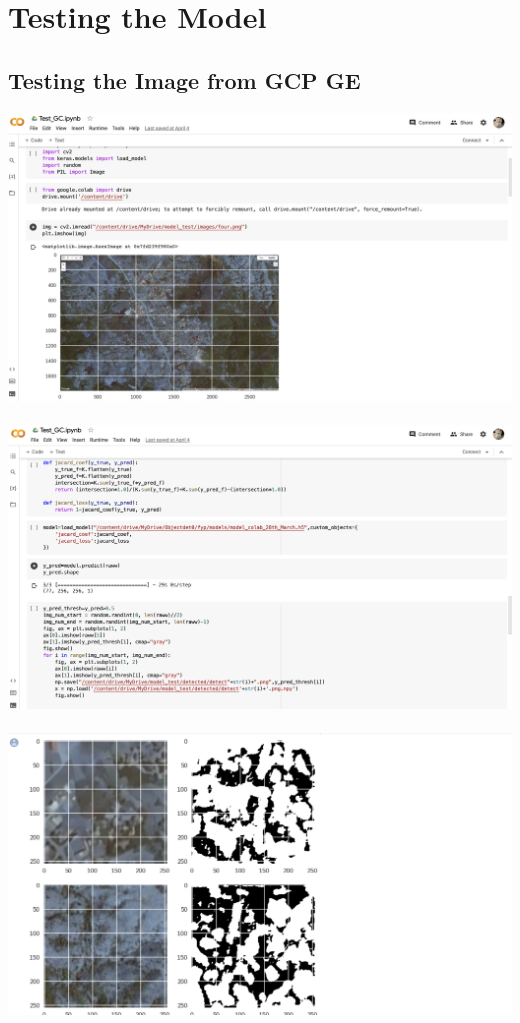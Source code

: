 \chapter{Testing the Model}
\section{Testing the Image from GCP GE}
\includegraphics[scale=0.4]{screenshts/19.png}\\\\
\includegraphics[scale=0.4]{screenshts/20.png}\\\\
\includegraphics[scale=0.4]{screenshts/21.png}\\\\\\\
